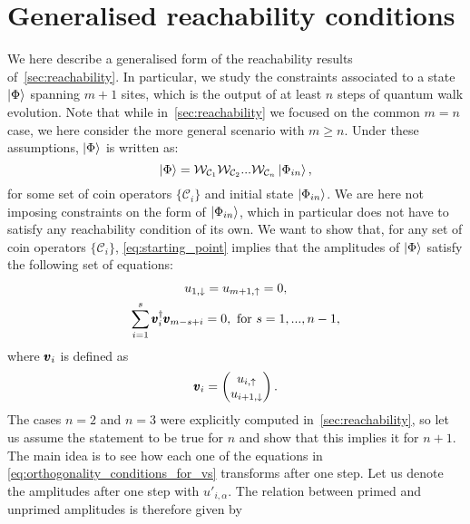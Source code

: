 \section{Generalised reachability conditions}
\label{app:reachability_conditions}
We here describe a generalised form of the reachability results of~\cref{sec:reachability}.
In particular, we study the constraints associated to a state $\ket\Phi$ spanning $m+1$ sites, which is the output of at least $n$ steps of quantum walk evolution.
Note that while in~\cref{sec:reachability} we focused on the common $m=n$ case, we here consider the more general scenario with $m \ge n$.
Under these assumptions, $\ket\Phi$ is written as: 
\begin{equation}
	\ket\Phi =
	\mathcal W_{\mathcal C_{1}} \mathcal W_{\mathcal C_{2}} ... \mathcal W_{\mathcal C_{n}}
	\ket{\Phi_{in}},
	\label{eq:starting_point}
\end{equation}
for some set of coin operators $\{\mathcal C_i \}$ and initial state $\ket{\Phi_{in}}$.
We are here not imposing constraints on the form of $\ket{\Phi_{in}}$, which in particular does not have to satisfy any reachability condition of its own.
We want to show that, for any set of coin operators $\{\mathcal C_i \}$, \cref{eq:starting_point} implies that the amplitudes of $\ket\Phi$ satisfy the following set of equations:
\begin{gather}
	u_{1,\downarrow} = u_{m+1, \uparrow} = 0,
	\label{eq:vanishing_amplitudes}
	\\
	\sum_{i=1}^s \pmb{v}_i^\dagger \pmb{v}_{m-s+i} = 0,
	\text{ for } s=1,..., n-1,
	\label{eq:orthogonality_conditions_for_vs}
\end{gather}
where $\pmb{v}_{i}$ is defined as
\begin{equation*}
	\pmb{v}_i =
	\begin{pmatrix}
		u_{i,\uparrow} \\ u_{i+1, \downarrow}
	\end{pmatrix}.
\end{equation*}
The cases $n=2$ and $n=3$ were explicitly computed in~\cref{sec:reachability},
so let us assume the statement to be true for $n$ and show that this implies it for $n+1$.
The main idea is to see how each one of the equations in \cref{eq:orthogonality_conditions_for_vs} transforms after one step.
Let us denote the amplitudes after one step with $u'_{i,\alpha}$.
The relation between primed and unprimed amplitudes is therefore given by
